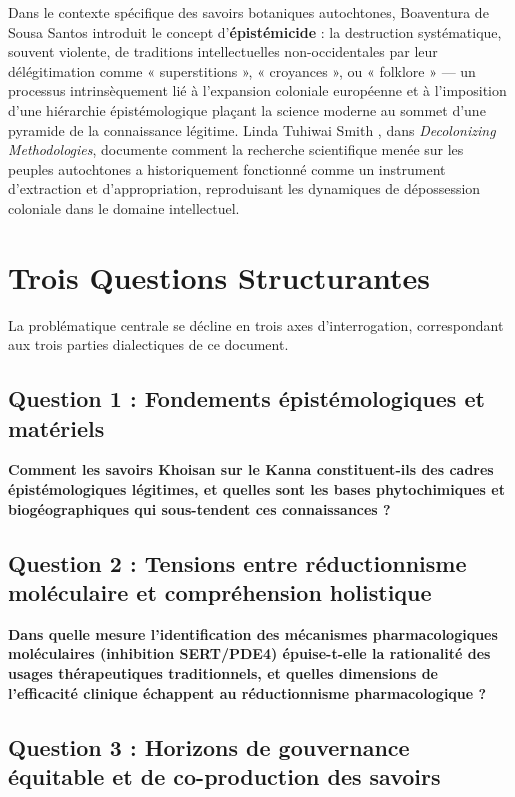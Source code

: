 \documentclass[12pt,a4paper]{report}
\begin{document}
Dans le contexte spécifique des savoirs botaniques autochtones, Boaventura de Sousa Santos \cite{Santos2014} introduit le concept d'\textbf{épistémicide} : la destruction systématique, souvent violente, de traditions intellectuelles non-occidentales par leur délégitimation comme « superstitions », « croyances », ou « folklore » — un processus intrinsèquement lié à l'expansion coloniale européenne et à l'imposition d'une hiérarchie épistémologique plaçant la science moderne au sommet d'une pyramide de la connaissance légitime. Linda Tuhiwai Smith \cite{Smith1999}, dans \textit{Decolonizing Methodologies}, documente comment la recherche scientifique menée sur les peuples autochtones a historiquement fonctionné comme un instrument d'extraction et d'appropriation, reproduisant les dynamiques de dépossession coloniale dans le domaine intellectuel.

\section{Trois Questions Structurantes}

La problématique centrale se décline en trois axes d'interrogation, correspondant aux trois parties dialectiques de ce document.

\subsection{Question 1 : Fondements épistémologiques et matériels}

\textbf{Comment les savoirs Khoisan sur le Kanna constituent-ils des cadres épistémologiques légitimes, et quelles sont les bases phytochimiques et biogéographiques qui sous-tendent ces connaissances ?}

\subsection{Question 2 : Tensions entre réductionnisme moléculaire et compréhension holistique}

\textbf{Dans quelle mesure l'identification des mécanismes pharmacologiques moléculaires (inhibition SERT/PDE4) épuise-t-elle la rationalité des usages thérapeutiques traditionnels, et quelles dimensions de l'efficacité clinique échappent au réductionnisme pharmacologique ?}

\subsection{Question 3 : Horizons de gouvernance équitable et de co-production des savoirs}
\end{document}
